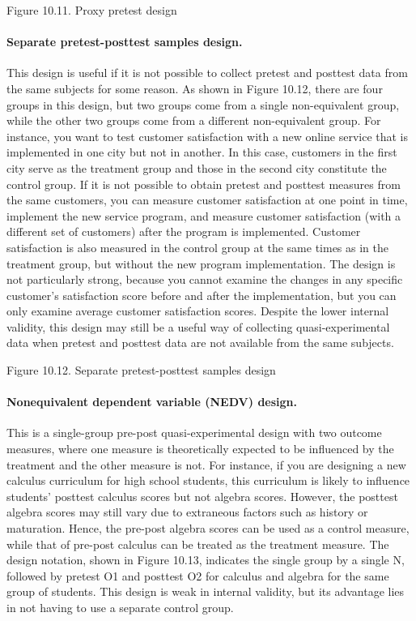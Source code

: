 Figure 10.11. Proxy pretest design

\paragraph{Separate pretest-posttest samples design.} This design is useful if it is not possible to collect pretest and posttest data from the same subjects for some reason. As shown in Figure 10.12, there are four groups in this design, but two groups come from a single non-equivalent group, while the other two groups come from a different non-equivalent group. For instance, you want to test customer satisfaction with a new online service that is implemented in one city but not in another. In this case, customers in the first city serve as the treatment group and those in the second city constitute the control group. If it is not possible to obtain pretest and posttest measures from the same customers, you can measure customer satisfaction at one point in time, implement the new service program, and measure customer satisfaction (with a different set of customers) after the program is implemented. Customer satisfaction is also measured in the control group at the same times as in the treatment group, but without the new program implementation. The design is not particularly strong, because you cannot examine the changes in any specific customer’s satisfaction score before and after the implementation, but you can only examine average customer satisfaction scores. Despite the lower internal validity, this design may still be a useful way of collecting quasi-experimental data when pretest and posttest data are not available from the same subjects.

Figure 10.12. Separate pretest-posttest samples design

\paragraph{Nonequivalent dependent variable (NEDV) design.} This is a single-group pre-post quasi-experimental design with two outcome measures, where one measure is theoretically expected to be influenced by the treatment and the other measure is not. For instance, if you are designing a new calculus curriculum for high school students, this curriculum is likely to influence students’ posttest calculus scores but not algebra scores. However, the posttest algebra scores may still vary due to extraneous factors such as history or maturation. Hence, the pre-post algebra scores can be used as a control measure, while that of pre-post calculus can be treated as the treatment measure. The design notation, shown in Figure 10.13, indicates the single group by a single N, followed by pretest O1 and posttest O2 for calculus and algebra for the same group of students. This design is weak in internal validity, but its advantage lies in not having to use a separate control group.

